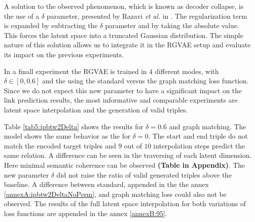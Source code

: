 A solution to the observed phenomenon, which is known as decoder collapse, is the use of a $\delta$ parameter, presented by Razavi \textit{et al.} in \cite{razavi_preventing_2018}. The regularization term is expanded by subtracting the $\delta$ parameter and by taking the absolute value. This forces the latent space into a truncated Gaussian distribution. The simple nature of this solution allows us to integrate it in the RGVAE setup and evaluate its impact on the previous experiments.

In a finall experiment the RGVAE is trained in $4$ different modes, with $\delta \in [0, 0.6]$ and the using the standard versus the graph matching loss function. Since we do not expect this new parameter to have a significant impact on the link prediction results, the most informative and comparable experiments are latent space interpolation and the generation of valid triples.

Table \ref{tab5:ipbtw2Delta} shows the results for $\delta = 0.6$ and graph matching. The model shows the same behavior as the for $\delta = 0$. The start and end triple do not match the encoded target triples and $9$ out of $10$ interpolation steps predict the same relation. A difference can be seen in the traversing of each latent dimension. Here minimal semantic coherence can be observed \textbf{(Table in Appendix)}.
The new parameter $\delta$ did not raise the ratio of valid generated triples above the baseline.
A difference between standard, appended in the the annex \ref{annexA:ipbtw2DeltaNoPerm}, and graph matching loss could also not be observed. The results of the full latent space interpolation for both variations of loss functions are appended in the annex \ref{annexB:95}.

